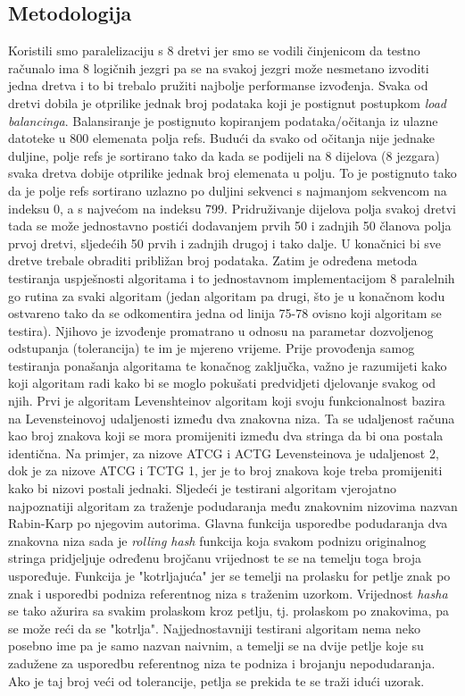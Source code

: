 \documentclass[conference]{IEEEtran}
\begin{document}
\subsection{Metodologija}
Koristili smo paralelizaciju s 8 dretvi jer smo se vodili činjenicom da testno računalo ima 8 logičnih jezgri pa se na svakoj jezgri može nesmetano izvoditi jedna dretva i to bi trebalo pružiti najbolje performanse izvođenja. Svaka od dretvi dobila je otprilike jednak broj podataka koji je postignut postupkom \textit{load balancinga}. Balansiranje je postignuto kopiranjem podataka/očitanja iz ulazne datoteke u 800 elemenata polja refs. Budući da svako od očitanja nije jednake duljine, polje refs je sortirano tako da kada se podijeli na 8 dijelova (8 jezgara) svaka dretva dobije otprilike jednak broj elemenata u polju. To je postignuto tako da je polje refs sortirano uzlazno po duljini sekvenci s najmanjom sekvencom na indeksu 0, a s najvećom na indeksu 799. Pridruživanje dijelova polja svakoj dretvi tada se može jednostavno postići dodavanjem prvih 50 i zadnjih 50 članova polja prvoj dretvi, sljedećih 50 prvih i zadnjih drugoj i tako dalje. U konačnici bi sve dretve trebale obraditi približan broj podataka. Zatim je određena metoda testiranja uspješnosti algoritama i to jednostavnom implementacijom 8 paralelnih go rutina za svaki algoritam (jedan algoritam pa drugi, što je u konačnom kodu ostvareno tako da se odkomentira jedna od linija 75-78 ovisno koji algoritam se testira). Njihovo je izvođenje promatrano u odnosu na parametar dozvoljenog odstupanja (tolerancija) te im je mjereno vrijeme.
Prije provođenja samog testiranja ponašanja algoritama te konačnog zaključka, važno je razumijeti kako koji algoritam radi kako bi se moglo pokušati predvidjeti djelovanje svakog od njih. Prvi je algoritam Levenshteinov algoritam koji svoju funkcionalnost bazira na Levensteinovoj udaljenosti između dva znakovna niza. Ta se udaljenost računa kao broj znakova koji se mora promijeniti između dva stringa da bi ona postala identična. Na primjer, za nizove ATCG i ACTG Levensteinova je udaljenost 2, dok je za nizove ATCG i TCTG 1, jer je to broj znakova koje treba promijeniti kako bi nizovi postali jednaki. Sljedeći je testirani algoritam vjerojatno najpoznatiji algoritam za traženje podudaranja među znakovnim nizovima nazvan Rabin-Karp po njegovim autorima. Glavna funkcija usporedbe podudaranja dva znakovna niza sada je \textit{rolling hash} funkcija koja svakom podnizu originalnog stringa pridjeljuje određenu brojčanu vrijednost te se na temelju toga broja uspoređuje. Funkcija je "kotrljajuća" jer se temelji na prolasku for petlje znak po znak i usporedbi podniza referentnog niza s traženim uzorkom. Vrijednost \textit{hasha} se tako ažurira sa svakim prolaskom kroz petlju, tj. prolaskom po znakovima, pa se može reći da se "kotrlja". Najjednostavniji testirani algoritam nema neko posebno ime pa je samo nazvan naivnim, a temelji se na dvije petlje koje su zadužene za usporedbu referentnog niza te podniza i brojanju nepodudaranja. Ako je taj broj veći od tolerancije, petlja se prekida te se traži idući uzorak.
\end{document}
